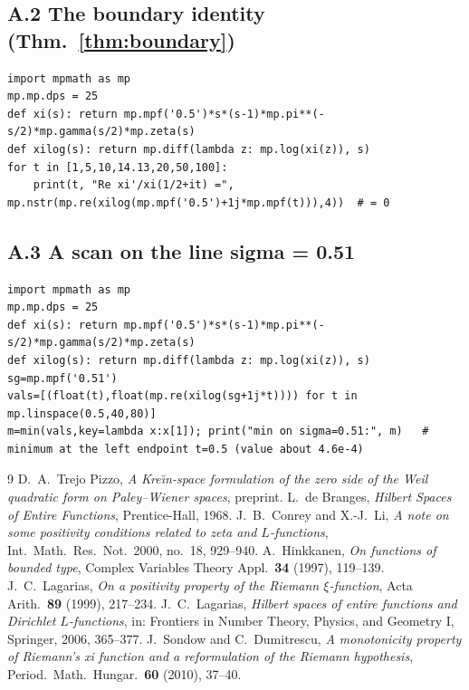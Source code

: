 \documentclass[11pt]{amsart}
\theoremstyle{definition}
\theoremstyle{remark}
\begin{document}
\subsection*{A.2 The boundary identity (Thm.~\ref{thm:boundary})}
\begin{lstlisting}
import mpmath as mp
mp.mp.dps = 25
def xi(s): return mp.mpf('0.5')*s*(s-1)*mp.pi**(-s/2)*mp.gamma(s/2)*mp.zeta(s)
def xilog(s): return mp.diff(lambda z: mp.log(xi(z)), s)
for t in [1,5,10,14.13,20,50,100]:
    print(t, "Re xi'/xi(1/2+it) =", mp.nstr(mp.re(xilog(mp.mpf('0.5')+1j*mp.mpf(t))),4))  # = 0
\end{lstlisting}

\subsection*{A.3 A scan on the line sigma = 0.51}
\begin{lstlisting}
import mpmath as mp
mp.mp.dps = 25
def xi(s): return mp.mpf('0.5')*s*(s-1)*mp.pi**(-s/2)*mp.gamma(s/2)*mp.zeta(s)
def xilog(s): return mp.diff(lambda z: mp.log(xi(z)), s)
sg=mp.mpf('0.51')
vals=[(float(t),float(mp.re(xilog(sg+1j*t)))) for t in mp.linspace(0.5,40,80)]
m=min(vals,key=lambda x:x[1]); print("min on sigma=0.51:", m)   # minimum at the left endpoint t=0.5 (value about 4.6e-4)
\end{lstlisting}

\begin{thebibliography}{9}
 D.~A.~Trejo Pizzo, \emph{A Kre\u\i n-space formulation of the zero side of the Weil quadratic form on Paley--Wiener spaces}, preprint.
 L.~de Branges, \emph{Hilbert Spaces of Entire Functions}, Prentice-Hall, 1968.
 J.~B.~Conrey and X.-J.~Li, \emph{A note on some positivity conditions related to zeta and $L$-functions}, Int.\ Math.\ Res.\ Not.\ 2000, no.~18, 929--940.
 A.~Hinkkanen, \emph{On functions of bounded type}, Complex Variables Theory Appl.\ \textbf{34} (1997), 119--139.
 J.~C.~Lagarias, \emph{On a positivity property of the Riemann $\xi$-function}, Acta Arith.\ \textbf{89} (1999), 217--234.
 J.~C.~Lagarias, \emph{Hilbert spaces of entire functions and Dirichlet $L$-functions}, in: Frontiers in Number Theory, Physics, and Geometry I, Springer, 2006, 365--377.
 J.~Sondow and C.~Dumitrescu, \emph{A monotonicity property of Riemann's xi function and a reformulation of the Riemann hypothesis}, Period.\ Math.\ Hungar.\ \textbf{60} (2010), 37--40.
\end{thebibliography}
\end{document}
